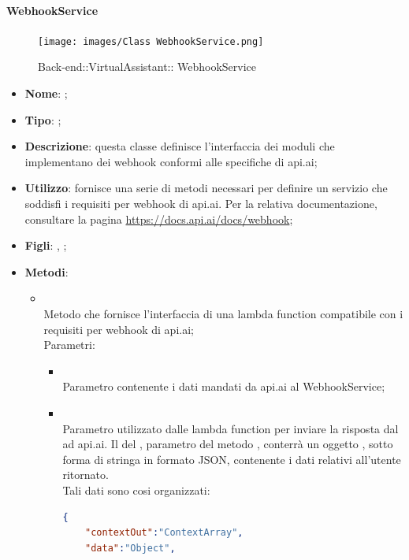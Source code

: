 \hypertarget{ WebhookService_label}{\paragraph{ WebhookService}}
\begin{figure}[h]
	\centering
	\texttt{[image: images/Class WebhookService.png]}
	\caption{Back-end::VirtualAssistant:: WebhookService}
\end{figure}
\begin{itemize}
	\item \textbf{Nome}: ;
	\item \textbf{Tipo}: ;
	\item \textbf{Descrizione}: questa classe definisce l'interfaccia dei moduli che implementano dei webhook conformi alle specifiche di api.ai;
	\item \textbf{Utilizzo}: fornisce una serie di metodi necessari per definire un servizio che soddisfi i requisiti per webhook di api.ai.
Per la relativa documentazione, consultare la pagina \url{https://docs.api.ai/docs/webhook};
	\item \textbf{Figli}: , ;
	\item \textbf{Metodi}:
	\begin{itemize}
		\item[]  \\
		Metodo che fornisce l'interfaccia di una lambda function compatibile con i requisiti per webhook di api.ai;\\
		Parametri:
		\begin{itemize}
			\item {} \\
			Parametro contenente i dati mandati da api.ai al WebhookService;
			\item {} \\
			Parametro utilizzato dalle lambda function per inviare la risposta dal  ad api.ai. Il  del , parametro del metodo , conterrà un oggetto , sotto forma di stringa in formato JSON, contenente i dati relativi all'utente ritornato.\\
Tali dati sono cosi organizzati:
\begin{lstlisting}[language=json,firstnumber=1]
{
    "contextOut":"ContextArray",
    "data":"Object",

\end{lstlisting}
\end{itemize}
\end{itemize}
\end{itemize}
